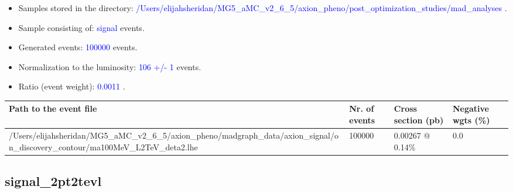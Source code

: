 \documentclass[a4paper, 10pt]{article}
\begin{document}
\begin{itemize}
  \item Samples stored in the directory: \textcolor{blue}{/\-Users/\-elijahsheridan/\-MG5\_aMC\_v2\_6\_5/\-axion\_pheno/\-post\_optimization\_studies/\-mad\_analyses} .
   \item Sample consisting of: \textcolor{blue}{signal}  events.
   \item Generated events: \textcolor{blue}{100000 }  events.
   \item Normalization to the luminosity: \textcolor{blue}{106}\textcolor{blue}{ +/\-- }\textcolor{blue}{1 }  events.
   \item Ratio (event weight): \textcolor{blue}{0.0011 } .  
 
\end{itemize}
\begin{table}[H]
  \begin{center}
    \begin{tabular}{|m{55.0mm}|m{25.0mm}|m{30.0mm}|m{30.0mm}|}
      \hline
      {\cellcolor{yellow}         Path to the event file}& {\cellcolor{yellow}         Nr. of events}& {\cellcolor{yellow}         Cross section (pb)}& {\cellcolor{yellow}         Negative wgts (\%)}\\
      \hline
      {\cellcolor{white}          /\-Users/\-elijahsheridan/\-MG5\_aMC\_v2\_6\_5/\-axion\_pheno/\-madgraph\_data/\-axion\_signal/\-on\_discovery\_contour/\-ma100MeV\_L2TeV\_deta2.lhe}& {\cellcolor{white}          100000}& {\cellcolor{white}          0.00267 @ 0.14\%}& {\cellcolor{white}          0.0}\\
\hline
    \end{tabular}
  \end{center}
\end{table}

\subsection{ signal\_2pt2tevl}
\end{document}
